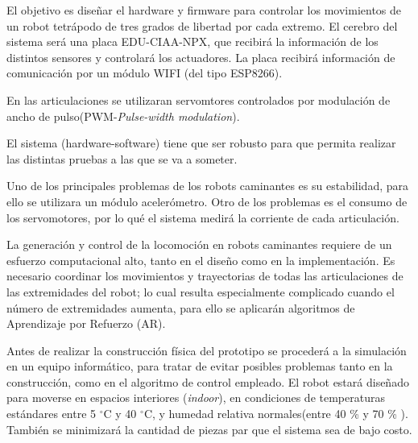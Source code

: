 \documentclass[
11pt, %
codirector, %
]{charter}
\begin{document}



El objetivo es diseñar el hardware y firmware para controlar los movimientos de un robot tetrápodo de tres grados de libertad por cada extremo. El cerebro del sistema será una placa EDU-CIAA-NPX, que recibirá la información de los distintos sensores y controlará los actuadores. La placa recibirá información de comunicación por un módulo WIFI (del tipo ESP8266). 

En las articulaciones se utilizaran servomtores controlados por modulación de ancho de pulso(PWM-\textit{Pulse-width modulation}). 

El sistema (hardware-software) tiene que ser robusto para que permita realizar las distintas pruebas a las que se va a someter.

Uno de los principales problemas de los robots caminantes es su estabilidad, para ello se utilizara un módulo acelerómetro. Otro de los problemas es el consumo de los servomotores, por lo qué el sistema medirá la corriente de cada articulación.   

La generación y control de la locomoción en robots caminantes requiere de un esfuerzo computacional alto, tanto en el diseño como en la implementación. Es necesario coordinar los movimientos y trayectorias de todas las articulaciones de las extremidades del robot; lo cual resulta especialmente complicado cuando el número de extremidades aumenta, para ello se aplicarán algoritmos de Aprendizaje por Refuerzo (AR).

Antes de realizar la construcción física del prototipo se procederá a la simulación en un equipo informático, para tratar de evitar posibles problemas tanto en la construcción, como en el algoritmo de control empleado. 
El robot estará diseñado para moverse en espacios interiores (\textit{indoor}), en condiciones de temperaturas estándares entre 5 $^\circ$C y 40 $^\circ$C, y humedad relativa normales(entre 40 \% y 70 \% ).
También se minimizará la cantidad de piezas par que el sistema sea de bajo costo.  
\end{document}
